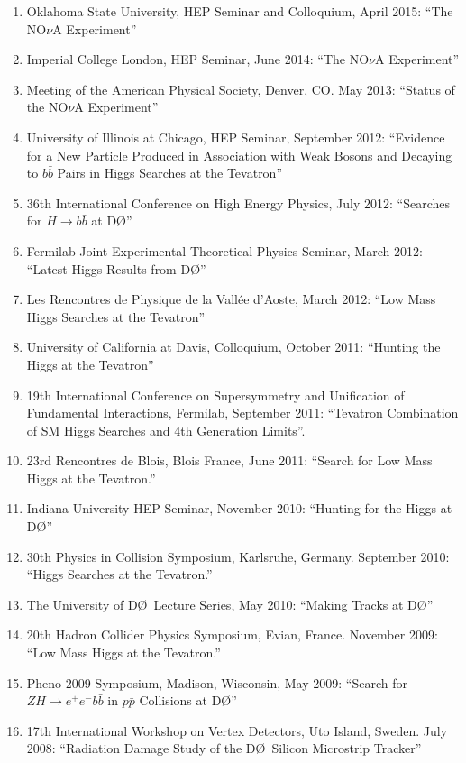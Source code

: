 \documentclass[amsmath,amssymb]{revtex4}
\def\dzero{D\O}
\begin{document}
\begin{enumerate}
\item Oklahoma State University, HEP Seminar and Colloquium, April 2015:
``The NO$\nu$A Experiment''
\item Imperial College London, HEP Seminar, June 2014:
``The NO$\nu$A Experiment''
\item  Meeting of the American Physical Society, Denver, CO.  May 2013:
``Status of the NO$\nu$A Experiment''
\item University of Illinois at Chicago, HEP Seminar, September 2012:
``Evidence for a New Particle Produced in Association with Weak Bosons 
  and Decaying to $b\bar{b}$ Pairs in Higgs Searches at the Tevatron''
\item 36th International Conference on High Energy Physics, July 2012:
``Searches for $H\to b\bar{b}$ at \dzero''
\item Fermilab Joint Experimental-Theoretical Physics Seminar, March 2012:
``Latest Higgs Results from \dzero''
\item Les Rencontres de Physique de la Vallée d'Aoste, March 2012:
``Low Mass Higgs Searches at the Tevatron''
\item University of California at Davis, Colloquium, October 2011:
``Hunting the Higgs at the Tevatron''
\item 19th International Conference on Supersymmetry and Unification of Fundamental Interactions,
Fermilab, September 2011:
``Tevatron Combination of SM Higgs Searches and 4th Generation Limits''.
\item 23rd Rencontres de Blois, Blois France, June 2011:
``Search for Low Mass Higgs at the Tevatron.''
\item Indiana University HEP Seminar, November 2010:
``Hunting for the Higgs at \dzero''
\item 30th Physics in Collision Symposium, Karlsruhe, Germany.  September 2010:
``Higgs Searches at the Tevatron.''
\item The University of \dzero~Lecture Series, May 2010: ``Making Tracks at \dzero''
\item 20th Hadron Collider Physics Symposium, Evian, France. November 2009:
``Low Mass Higgs at the Tevatron.''
\item Pheno 2009 Symposium, Madison, Wisconsin, May 2009: 
``Search for $ZH\to e^+e^-b{\bar b}$ in $p\bar{p}$ Collisions at \dzero''
\item 17th International Workshop on Vertex Detectors, Uto Island, Sweden.  July 2008:
``Radiation Damage Study of the \dzero\ Silicon Microstrip Tracker''

\end{enumerate}
\end{document}
